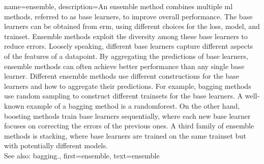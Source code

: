 {name={ensemble}, 
	description={An ensemble method combines multiple 
		\gls{ml} methods, referred to as base learners, to improve overall performance. 
		The base learners can be obtained from \gls{erm}, using different choices for 
	 	the \gls{loss}, \gls{model}, and \gls{trainset}. Ensemble methods exploit the 
	 	diversity among these base learners to reduce errors. Loosely speaking, different base 
	 	learners capture different aspects of the \glspl{feature} of a \gls{datapoint}. 
	 	By aggregating the \glspl{prediction} of base learners, ensemble methods can 
	 	often achieve better performance than any single base learner. Different  
	 	ensemble methods use different constructions for the base learners and how 
	 	to aggregate their \glspl{prediction}. For example, \gls{bagging} methods use random sampling 
	 	to construct different \glspl{trainset} for the base learners. A well-known example 
	 	of a \gls{bagging} method is a \gls{randomforest}. On the other hand, \gls{boosting} methods train 
	 	base learners sequentially, where each new base learner focuses on correcting the 
	 	errors of the previous ones. A third family of ensemble methods is stacking, 
	 	where base learners are trained on the same \gls{trainset} but with potentially different \glspl{model}. 
		\\
	 	See also: \gls{bagging}.},
	 first={ensemble},
	 text={ensemble} 
}


